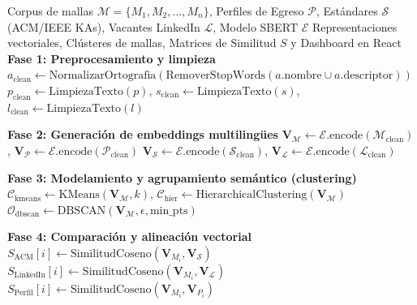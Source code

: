 \vspace{0.3cm}

\begin{algorithm}[H]
	\caption{Pipeline computacional de análisis semántico y comparación de mallas curriculares}
	\label{alg:pipeline_mallas}
	\small
	\begin{algorithmic}[1]
		\Require Corpus de mallas $\mathcal{M} = \{M_1, M_2, \dots, M_n\}$, Perfiles de Egreso $\mathcal{P}$, Estándares $\mathcal{S}$ (ACM/IEEE KAs), Vacantes LinkedIn $\mathcal{L}$, Modelo SBERT $\mathcal{E}$
		\Ensure Representaciones vectoriales, Clústeres de mallas, Matrices de Similitud $S$ y Dashboard en React
		\Statex
			\State \textbf{Fase 1: Preprocesamiento y limpieza}
				\State $a_{\text{clean}} \leftarrow \text{NormalizarOrtografia}(\text{RemoverStopWords}(a.\text{nombre} \cup a.\text{descriptor}))$
			\EndFor
				\State $p_{\text{clean}} \leftarrow \text{LimpiezaTexto}(p)$, \quad $s_{\text{clean}} \leftarrow \text{LimpiezaTexto}(s)$, \quad $l_{\text{clean}} \leftarrow \text{LimpiezaTexto}(l)$
			\EndFor
			
			\Statex
			\State \textbf{Fase 2: Generación de embeddings multilingües}
			\State $\mathbf{V}_{\mathcal{M}} \leftarrow \mathcal{E}.\text{encode}(\mathcal{M}_{\text{clean}})$, \quad $\mathbf{V}_{\mathcal{P}} \leftarrow \mathcal{E}.\text{encode}(\mathcal{P}_{\text{clean}})$
			\State $\mathbf{V}_{\mathcal{S}} \leftarrow \mathcal{E}.\text{encode}(\mathcal{S}_{\text{clean}})$, \quad $\mathbf{V}_{\mathcal{L}} \leftarrow \mathcal{E}.\text{encode}(\mathcal{L}_{\text{clean}})$
			
			\Statex
			\State \textbf{Fase 3: Modelamiento y agrupamiento semántico (clustering)}
			\State $\mathcal{C}_{\text{kmeans}} \leftarrow \text{KMeans}(\mathbf{V}_{\mathcal{M}}, k)$, \quad $\mathcal{C}_{\text{hier}} \leftarrow \text{HierarchicalClustering}(\mathbf{V}_{\mathcal{M}})$
			\State $\mathcal{O}_{\text{dbscan}} \leftarrow \text{DBSCAN}(\mathbf{V}_{\mathcal{M}}, \epsilon, \text{min\_pts})$ 
			
			\Statex
			\State \textbf{Fase 4: Comparación y alineación vectorial}
				\State $S_{\text{ACM}}[i] \leftarrow \text{SimilitudCoseno}(\mathbf{V}_{M_i}, \mathbf{V}_{\mathcal{S}})$ 
				\State $S_{\text{LinkedIn}}[i] \leftarrow \text{SimilitudCoseno}(\mathbf{V}_{M_i}, \mathbf{V}_{\mathcal{L}})$ 
				\State $S_{\text{Perfil}}[i] \leftarrow \text{SimilitudCoseno}(\mathbf{V}_{M_i}, \mathbf{V}_{P_i})$ 
			\EndFor
			

\end{algorithmic}
\end{algorithm}
